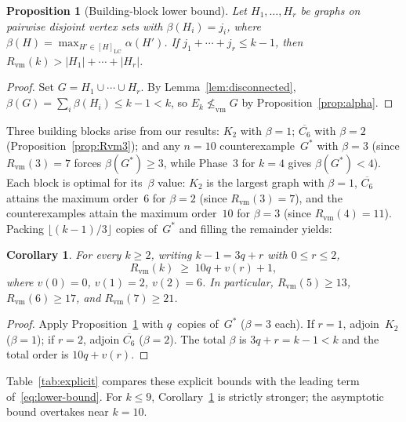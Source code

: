 \documentclass[11pt]{amsart}
\newtheorem{proposition}[theorem]{Proposition}
\newtheorem{corollary}[theorem]{Corollary}
\theoremstyle{definition}
\theoremstyle{remark}
\newcommand{\Rvm}{R_{\mathrm{vm}}}
\newcommand{\LC}{\mathrm{LC}}
\newcommand{\vm}{\leq_{\mathrm{vm}}}
\begin{document}
\begin{proposition}[Building-block lower bound]\label{prop:building}
  Let $H_1,\dots,H_r$ be graphs on pairwise disjoint vertex sets with
  $\beta(H_i)=j_i$, where
  $\beta(H)=\max_{H'\in[H]_{\LC}}\alpha(H')$.  If
  $j_1+\cdots+j_r\leq k-1$, then
  $\Rvm(k)>|H_1|+\cdots+|H_r|$.
\end{proposition}

\begin{proof}
  Set $G=H_1\cup\cdots\cup H_r$.  By
  Lemma~\ref{lem:disconnected},
  $\beta(G)=\sum_i\beta(H_i)\leq k-1<k$, so
  $E_k\not\vm G$ by Proposition~\ref{prop:alpha}.
\end{proof}

Three building blocks arise from our results:
$K_2$ with $\beta=1$;
$\overline{C_6}$ with $\beta=2$
(Proposition~\ref{prop:Rvm3}); and any $n=10$
counterexample~$G^*$ with $\beta=3$
(since $\Rvm(3)=7$ forces $\beta(G^*)\geq 3$, while Phase~3 for
$k=4$ gives $\beta(G^*)<4$).
Each block is optimal for its~$\beta$ value: $K_2$ is the largest
graph with $\beta=1$, $\overline{C_6}$ attains the maximum order~$6$
for $\beta=2$ (since $\Rvm(3)=7$), and the counterexamples attain the
maximum order~$10$ for $\beta=3$ (since $\Rvm(4)=11$).
Packing $\lfloor(k{-}1)/3\rfloor$ copies of~$G^*$ and filling
the remainder yields:

\begin{corollary}\label{cor:explicit}
  For every $k\geq 2$, writing $k-1=3q+r$ with $0\leq r\leq 2$,
  \[
    \Rvm(k) \;\geq\; 10q + v(r) + 1,
  \]
  where $v(0)=0$, $v(1)=2$, $v(2)=6$.
  In particular, $\Rvm(5)\geq 13$, $\Rvm(6)\geq 17$, and
  $\Rvm(7)\geq 21$.
\end{corollary}

\begin{proof}
  Apply Proposition~\ref{prop:building} with $q$~copies of~$G^*$
  ($\beta=3$ each).  If $r=1$, adjoin~$K_2$ ($\beta=1$); if $r=2$,
  adjoin $\overline{C_6}$ ($\beta=2$).  The total $\beta$ is
  $3q+r=k-1<k$ and the total order is $10q+v(r)$.
\end{proof}

Table~\ref{tab:explicit} compares these explicit bounds with the
leading term of~\eqref{eq:lower-bound}.  For $k\leq 9$,
Corollary~\ref{cor:explicit} is strictly stronger; the asymptotic bound
overtakes near $k=10$.
\end{document}
